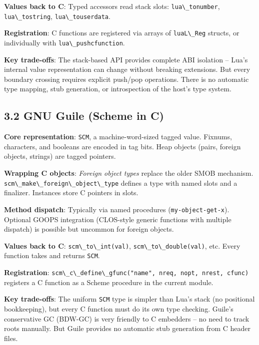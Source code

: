 \documentclass[
  12pt,
]{report}
\newcommand{\passthrough}[1]{#1}
\begin{document}
\textbf{Values back to C}: Typed accessors read stack slots:
\passthrough{\lstinline!lua\_tonumber!},
\passthrough{\lstinline!lua\_tostring!},
\passthrough{\lstinline!lua\_touserdata!}.

\textbf{Registration}: C functions are registered via arrays of
\passthrough{\lstinline!luaL\_Reg!} structs, or individually with
\passthrough{\lstinline!lua\_pushcfunction!}.

\textbf{Key trade-offs}: The stack-based API provides complete ABI
isolation -- Lua's internal value representation can change without
breaking extensions. But every boundary crossing requires explicit
push/pop operations. There is no automatic type mapping, stub
generation, or introspection of the host's type system.

\subsection{3.2 GNU Guile (Scheme in C)}\label{gnu-guile-scheme-in-c}

\textbf{Core representation}: \passthrough{\lstinline!SCM!}, a
machine-word-sized tagged value. Fixnums, characters, and booleans are
encoded in tag bits. Heap objects (pairs, foreign objects, strings) are
tagged pointers.

\textbf{Wrapping C objects}: \emph{Foreign object types} replace the
older SMOB mechanism.
\passthrough{\lstinline!scm\_make\_foreign\_object\_type!} defines a
type with named slots and a finalizer. Instances store C pointers in
slots.

\textbf{Method dispatch}: Typically via named procedures
(\passthrough{\lstinline!my-object-get-x!}). Optional GOOPS integration
(CLOS-style generic functions with multiple dispatch) is possible but
uncommon for foreign objects.

\textbf{Values back to C}: \passthrough{\lstinline!scm\_to\_int(val)!},
\passthrough{\lstinline!scm\_to\_double(val)!}, etc. Every function
takes and returns \passthrough{\lstinline!SCM!}.

\textbf{Registration}:
\passthrough{\lstinline!scm\_c\_define\_gfunc("name", nreq, nopt, nrest, cfunc)!}
registers a C function as a Scheme procedure in the current module.

\textbf{Key trade-offs}: The uniform \passthrough{\lstinline!SCM!} type
is simpler than Lua's stack (no positional bookkeeping), but every C
function must do its own type checking. Guile's conservative GC (BDW-GC)
is very friendly to C embedders -- no need to track roots manually. But
Guile provides no automatic stub generation from C header files.
\end{document}
